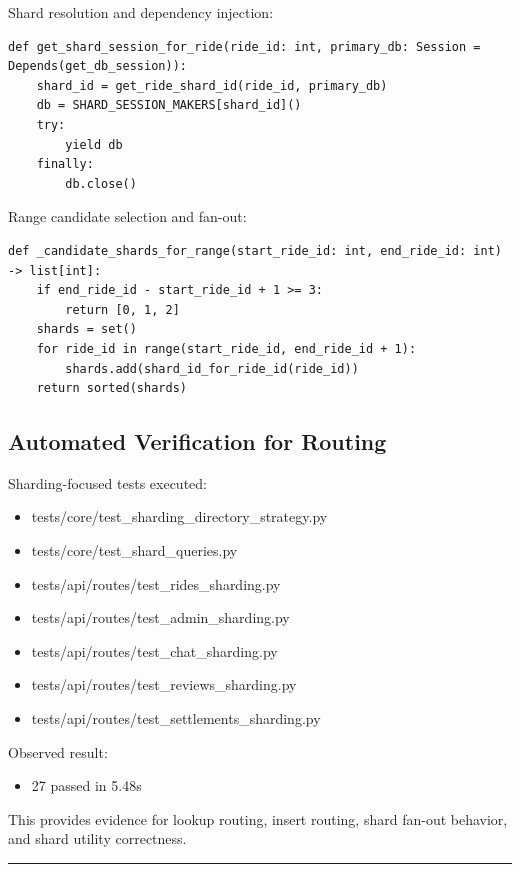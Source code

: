 \documentclass[12pt]{article}
\begin{document}
Shard resolution and dependency injection:

\begin{verbatim}
def get_shard_session_for_ride(ride_id: int, primary_db: Session = Depends(get_db_session)):
    shard_id = get_ride_shard_id(ride_id, primary_db)
    db = SHARD_SESSION_MAKERS[shard_id]()
    try:
        yield db
    finally:
        db.close()
\end{verbatim}

Range candidate selection and fan-out:

\begin{verbatim}
def _candidate_shards_for_range(start_ride_id: int, end_ride_id: int) -> list[int]:
    if end_ride_id - start_ride_id + 1 >= 3:
        return [0, 1, 2]
    shards = set()
    for ride_id in range(start_ride_id, end_ride_id + 1):
        shards.add(shard_id_for_ride_id(ride_id))
    return sorted(shards)
\end{verbatim}

\subsection{Automated Verification for Routing}

Sharding-focused tests executed:
\begin{itemize}
    \item tests/core/test\_sharding\_directory\_strategy.py
    \item tests/core/test\_shard\_queries.py
    \item tests/api/routes/test\_rides\_sharding.py
    \item tests/api/routes/test\_admin\_sharding.py
    \item tests/api/routes/test\_chat\_sharding.py
    \item tests/api/routes/test\_reviews\_sharding.py
    \item tests/api/routes/test\_settlements\_sharding.py
\end{itemize}

Observed result:
\begin{itemize}
    \item 27 passed in 5.48s
\end{itemize}

This provides evidence for lookup routing, insert routing, shard fan-out behavior, and shard utility correctness.

\hrule
\vspace{0.75em}
\end{document}
